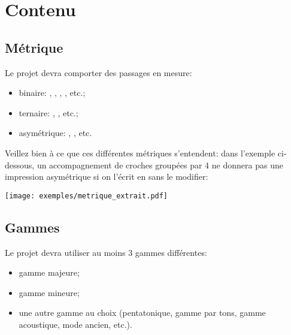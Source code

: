 \documentclass[11pt]{scrreprt}
\begin{document}
\section{Contenu}

\subsection{Métrique}
Le projet devra comporter des passages en mesure:
\begin{itemize}
\item binaire: , , , , etc.;
\item ternaire: , , etc.;
\item asymétrique: , , etc.
\end{itemize}

Veillez bien à ce que ces différentes métriques s'entendent: dans l'exemple ci-dessous, un accompagnement de croches groupées par 4 ne donnera pas une impression asymétrique si on l'écrit en  sans le modifier:
\begin{center}
   \texttt{[image: exemples/metrique\_extrait.pdf]}
\end{center}

\subsection{Gammes}
Le projet devra utiliser au moins 3 gammes différentes:

\begin{itemize}
\item gamme majeure;
\item gamme mineure;
\item une autre gamme au choix (pentatonique, gamme par tons, gamme acoustique, mode ancien, etc.).
\end{itemize}
\end{document}
